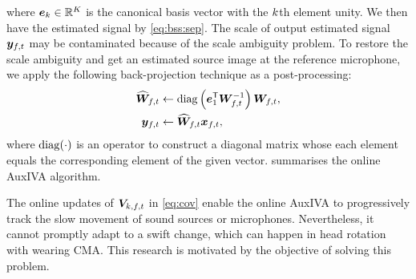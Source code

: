 \documentclass[sip,biber]{now-journal}
\begin{document}
where $\bm{e} _{k} \in \mathbb{R} ^{K}$ is the canonical basis vector with the $k$th element unity.
We then have the estimated signal by \eqref{eq:bss:sep}.
The scale of output estimated signal $\Est _{\ft}$ may be contaminated because of the scale ambiguity problem.
To restore the scale ambiguity and get an estimated source image at the reference microphone,
we apply the following back-projection technique \cite{Murata:2001:NC} as a post-processing:
\begin{align}
  \proj{\Demix} _{\ft}
    &\gets
    \diag\left(\eye _{1} ^{\top} \Demix _{\ft} ^{-1} \right) \Demix _{\ft},
    \label{eq:pb:w}
    \\
  \Est _{\ft}
    &\gets
    \proj{\Demix }_{\ft} \Obs _{\ft},
    \label{eq:pb:y}
\end{align}
where $\operatorname{diag}(\cdot)$ is an operator to construct a diagonal matrix whose each element equals the corresponding element of the given vector.
 summarises the online AuxIVA algorithm.

The online updates of $\cov _{\src,\ft}$ in \eqref{eq:cov} enable the online AuxIVA to progressively track the slow movement of sound sources or microphones.
Nevertheless, it cannot promptly adapt to a swift change, which can happen in head rotation with wearing CMA. This research is motivated by the objective of solving this problem.
\end{document}
